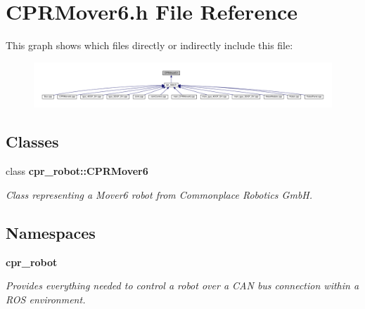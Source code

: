 \section{C\+P\+R\+Mover6.\+h File Reference}
\label{CPRMover6_8h}
This graph shows which files directly or indirectly include this file\+:
\nopagebreak
\begin{figure}[H]
\begin{center}
\leavevmode
\includegraphics[width=350pt]{CPRMover6_8h__dep__incl}
\end{center}
\end{figure}
\subsection*{Classes}
\begin{DoxyCompactItemize}
\item 
class \textbf{ cpr\+\_\+robot\+::\+C\+P\+R\+Mover6}
\begin{DoxyCompactList}\small\item\em Class representing a Mover6 robot from Commonplace Robotics GmbH. \end{DoxyCompactList}\end{DoxyCompactItemize}
\subsection*{Namespaces}
\begin{DoxyCompactItemize}
\item 
 \textbf{ cpr\+\_\+robot}
\begin{DoxyCompactList}\small\item\em Provides everything needed to control a robot over a C\+AN bus connection within a R\+OS environment. \end{DoxyCompactList}\end{DoxyCompactItemize}
